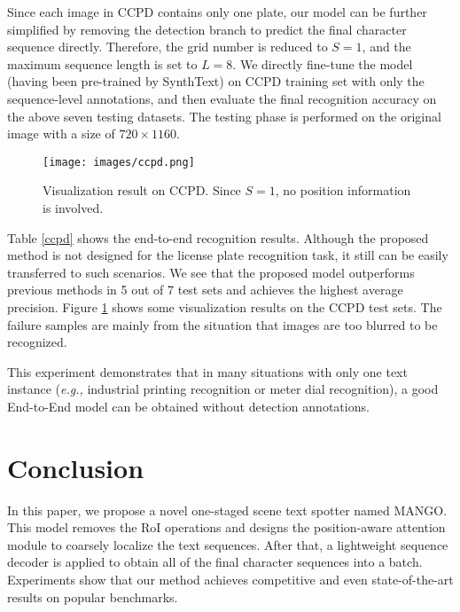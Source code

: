 \documentclass[letterpaper]{article} \usepackage{aaai21}  \usepackage{times}  \usepackage{helvet} \usepackage{courier}  \usepackage[hyphens]{url}  \usepackage{graphicx} \urlstyle{rm} \def\UrlFont{\rm}  \usepackage{natbib}  \usepackage{caption} \frenchspacing  \setlength{\pdfpagewidth}{8.5in}  \setlength{\pdfpageheight}{11in}  \usepackage{multirow}
\begin{document}
Since each image in CCPD contains only one plate, our model can be further simplified by removing the detection branch to  predict the final character sequence directly. Therefore, the grid number is reduced to $S=1$, and the maximum sequence length is set to $L=8$.
We directly fine-tune the model (having been pre-trained by SynthText) on CCPD training set with only the sequence-level annotations, and then evaluate the final recognition accuracy on the above seven testing datasets. The testing phase is performed on the original image with a size of $720\times 1160$.
\begin{figure}[!htpt]
\begin{center}
\texttt{[image: images/ccpd.png]}\\
\end{center}
   \caption{
   Visualization result on CCPD. Since $S=1$, no position information is involved.
   }
\label{fig:ccpd}
\end{figure}

Table \ref{ccpd} shows the end-to-end recognition results. Although the proposed method is not designed for the license plate recognition task, it still can be easily transferred to such scenarios.
We see that the proposed model outperforms previous methods in 5 out of 7 test sets and achieves the highest average precision.
Figure \ref{fig:ccpd} shows some visualization results on the CCPD test sets.
The failure samples are mainly from the situation that images are too blurred to be recognized.


This experiment demonstrates that in many situations with only one text instance (\emph{e.g.,} industrial printing recognition or meter dial recognition), a good End-to-End model can be obtained without detection annotations.

\section{Conclusion}
In this paper, we propose a novel one-staged scene text spotter named {MANGO}.
This model removes the RoI operations and designs the position-aware attention module to coarsely localize the text sequences.
After that, a lightweight sequence decoder is applied to obtain all of the final character sequences into a batch.
Experiments show that our method achieves competitive and even state-of-the-art results on popular benchmarks.


\newpage
{\footnotesize{


}
}
\end{document}
